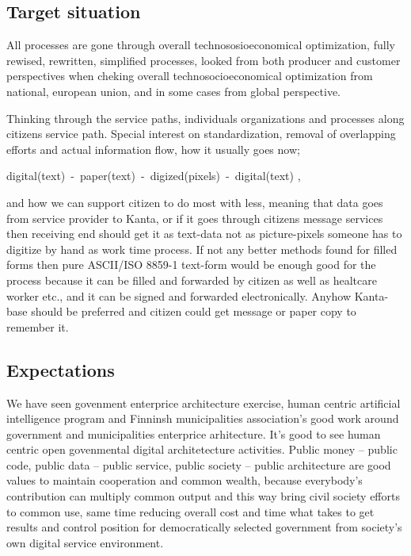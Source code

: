 \subsection{Target situation}
\label{target_situation}

All processes are gone through overall technososioeconomical optimization,
fully rewised, rewritten, simplified processes, look\-ed from both producer
and customer perspectives when cheking overall technosocioeconomical
optimization from national, european union, and in some cases from global
perspective.

Thinking through the service paths, individuals organizations and processes
along citizens service path. Special interest on standardization, removal
of overlapping efforts and actual information flow, how it usually goes now;
\hfill\break\begin{center}
digital(text)~-~paper(text)~-~digized(pixels)~-~digital(text)
\cite{VM006_00_2024},\end{center}
and how we can support citizen to do most with less, meaning that data goes
from service provider to Kanta, or if it goes through citizens message services
then receiving end should get it as text-data not as picture-pixels someone
has to digitize by hand as work time process. If not any better methods found
for filled forms then pure ASCII/ISO 8859-1 text-form would be enough good for
the process because it can be filled and forwarded by citizen as well as
healtcare worker etc., and it can be signed and forwarded electronically.
Anyhow Kanta-base should be preferred and citizen could get message or paper
copy to remember it.

\subsection{Expectations}
\label{expectations}

We have seen govenment enterprice architecture exercise, human centric
artificial intelligence program and Finninsh municipalities association's good
work around government and municipalities enterprice arhitecture. It's good
to see human centric open govenmental digital architetecture activities.
Public money -- public code, public data -- public service, public society --
public architecture are good values to maintain cooperation and common wealth,
because everybody's contribution can multiply common output and this way bring
civil society efforts to common use, same time reducing overall cost and time
what takes to get results and control position for democratically selected
government from society's own digital service environment.

